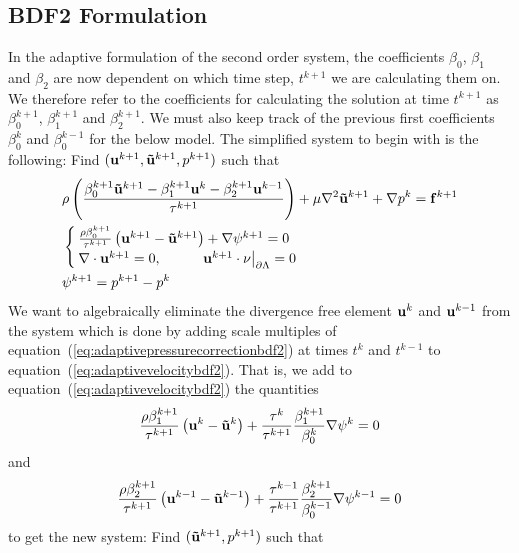 \documentclass[letterpaper]{erdc}
\begin{document}
\subsection{BDF2 Formulation} In the adaptive formulation of the second order
system, the coefficients $\beta_0$, $\beta_1$ and $\beta_2$ are now dependent
on which time step, $t^{k+1}$ we are calculating them on.  We therefore refer
to the coefficients for calculating the solution at time $t^{k+1}$ as
$\beta_0^{k+1}$, $\beta_1^{k+1}$ and $\beta_2^{k+1}$.  We must also keep track
of the previous first coefficients $\beta_0^{k}$ and $\beta_0^{k-1}$ for the
below model.  The simplified system to begin with is the following: Find
$(\textbf{u}^{k+1},\mathbf{\tilde{u}}^{k+1},p^{k+1})$ such that
\begin{align}
  &\rho\left( \frac{\beta_0^{k+1}\mathbf{\tilde{u}}^{k+1} - \beta_1^{k+1}\textbf{u}^{k} - \beta_2^{k+1}\textbf{u}^{k-1}}{\tau^{k+1}} \right) + \mu\nabla^2 \mathbf{\tilde{u}}^{k+1} + \nabla p^{k} = \mathbf{f}^{k+1}\label{eq:adaptivevelocitybdf2}\\
  &\begin{cases}
    \frac{\rho\beta_0^{k+1}}{\tau^{k+1}}\left( \textbf{u}^{k+1}-\mathbf{\tilde{u}}^{k+1}\right) + \nabla\psi^{k+1} = 0\\
    \nabla\cdot\textbf{u}^{k+1} = 0, \hspace{1cm} \left.\textbf{u}^{k+1}\cdot\nu\right|_{\partial\Lambda}=0
    \end{cases}\label{eq:adaptivepressurecorrectionbdf2}\\
  & \psi^{k+1} = p^{k+1} - p^{k}
\end{align}
We want to algebraically eliminate the divergence free element $\textbf{u}^{k}$ and
$\textbf{u}^{k-1}$ from the system which is done by adding scale multiples of
equation~(\ref{eq:adaptivepressurecorrectionbdf2}) at times $t^{k}$ and
$t^{k-1}$ to equation~(\ref{eq:adaptivevelocitybdf2}).  That is, we add to
equation~(\ref{eq:adaptivevelocitybdf2}) the quantities
\begin{equation*}
  \frac{\rho\beta_1^{k+1}}{\tau^{k+1}}\left( \textbf{u}^{k} - \mathbf{\tilde{u}}^{k} \right) + \frac{\tau^{k}}{\tau^{k+1}}\frac{\beta_1^{k+1}}{\beta_0^{k}}\nabla\psi^{k} = 0
\end{equation*}
and 
\begin{equation*}
  \frac{\rho\beta_2^{k+1}}{\tau^{k+1}}\left( \textbf{u}^{k-1} - \mathbf{\tilde{u}}^{k-1} \right) + \frac{\tau^{k-1}}{\tau^{k+1}}\frac{\beta_2^{k+1}}{\beta_0^{k-1}}\nabla\psi^{k-1} = 0
\end{equation*}
to get the new system:  Find $(\mathbf{\tilde{u}}^{k+1},p^{k+1})$ such that
\end{document}
